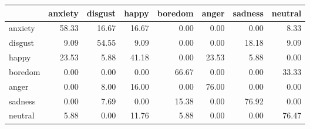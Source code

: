 \begin{tabular}{lrrrrrrr}
\toprule
{} &  anxiety &  disgust &  happy &  boredom &  anger &  sadness &  neutral \\
\midrule
anxiety &    58.33 &    16.67 &  16.67 &     0.00 &   0.00 &     0.00 &     8.33 \\
disgust &     9.09 &    54.55 &   9.09 &     0.00 &   0.00 &    18.18 &     9.09 \\
happy   &    23.53 &     5.88 &  41.18 &     0.00 &  23.53 &     5.88 &     0.00 \\
boredom &     0.00 &     0.00 &   0.00 &    66.67 &   0.00 &     0.00 &    33.33 \\
anger   &     0.00 &     8.00 &  16.00 &     0.00 &  76.00 &     0.00 &     0.00 \\
sadness &     0.00 &     7.69 &   0.00 &    15.38 &   0.00 &    76.92 &     0.00 \\
neutral &     5.88 &     0.00 &  11.76 &     5.88 &   0.00 &     0.00 &    76.47 \\
\bottomrule
\end{tabular}

